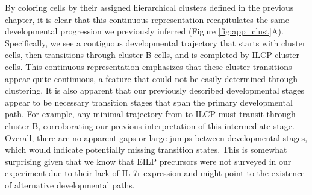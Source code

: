 \begin{subappendices}
By coloring cells by their assigned hierarchical clusters defined in the previous chapter, it is clear that this continuous representation recapitulates the same developmental progression we previously inferred (Figure \ref{fig:app_clust}A). Specifically, we see a contiguous developmental trajectory that starts with \aLP cluster cells, then transitions through cluster B cells, and is completed by ILCP cluster cells. This continuous representation emphasizes that these cluster transitions appear quite continuous, a feature that could not be easily determined through clustering. It is also apparent that our previously described developmental stages appear to be necessary transition stages that span the primary developmental path. For example, any minimal trajectory from \aLP to ILCP must transit through cluster B, corroborating our previous interpretation of this intermediate stage. Overall, there are no apparent gaps or large jumps between developmental stages, which would indicate potentially missing transition states. This is somewhat surprising given that we know that EILP precursors were not surveyed in our experiment due to their lack of IL-7r expression and might point to the existence of alternative developmental paths. 


\end{subappendices}
